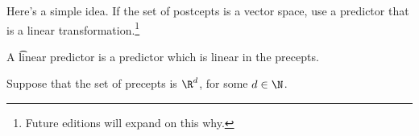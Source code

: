 

Here's a simple idea.
If the set of postcepts is a vector space, use a predictor that is a linear transformation.\footnote{Future editions will expand on this why.}


A \t{linear predictor} is a predictor which is linear in the precepts.


Suppose that the set of precepts is $\R^d$, for some $d \in \N$.


\blankpage
